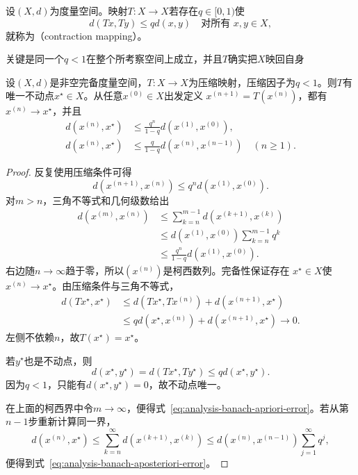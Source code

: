 \begin{definition}[压缩映射]
\label{def:analysis-contraction}
设$(X,d)$为度量空间。映射$T:X\to X$若存在$q\in[0,1)$使
\begin{equation}
  d(Tx,Ty)\leq qd(x,y)
  \quad\text{对所有 }x,y\in X,
\label{eq:analysis-contraction-definition}
\end{equation}
就称为（contraction mapping）。
\end{definition}
关键是同一个$q<1$在整个所考察空间上成立，并且$T$确实把$X$映回自身
\begin{theorem}[Banach压缩映射定理]
\label{thm:analysis-banach-fixed-point}
设$(X,d)$是非空完备度量空间，$T:X\to X$为压缩映射，压缩因子为$q<1$。则$T$有
唯一不动点$x^\star\in X$。从任意$x^{(0)}\in X$出发定义
$x^{(n+1)}=T(x^{(n)})$，都有$x^{(n)}\to x^\star$，并且
\begin{align}
  d(x^{(n)},x^\star)
  &\leq
  \frac{q^n}{1-q}d(x^{(1)},x^{(0)}),
\label{eq:analysis-banach-apriori-error}\\
  d(x^{(n)},x^\star)
  &\leq
  \frac{q}{1-q}d(x^{(n)},x^{(n-1)})
  \quad(n\geq1).
\label{eq:analysis-banach-aposteriori-error}
\end{align}
\end{theorem}
\begin{proof}
反复使用压缩条件可得
\[   d(x^{(n+1)},x^{(n)})   \leq   q^n d(x^{(1)},x^{(0)}). \]
对$m>n$，三角不等式和几何级数给出
\begin{align*}
  d(x^{(m)},x^{(n)})
  &\leq
  \sum_{k=n}^{m-1}d(x^{(k+1)},x^{(k)})\\
  &\leq
  d(x^{(1)},x^{(0)})\sum_{k=n}^{m-1}q^k\\
  &\leq
  \frac{q^n}{1-q}d(x^{(1)},x^{(0)}).
\end{align*}
右边随$n\to\infty$趋于零，所以$(x^{(n)})$是柯西数列。完备性保证存在
$x^\star\in X$使$x^{(n)}\to x^\star$。由压缩条件与三角不等式，
\begin{align*}
 d(Tx^\star,x^\star)
 &\leq d(Tx^\star,Tx^{(n)})+d(x^{(n+1)},x^\star)\\
 &\leq qd(x^\star,x^{(n)})+d(x^{(n+1)},x^\star)
 \longrightarrow0.
\end{align*}
左侧不依赖$n$，故$T(x^\star)=x^\star$。

若$y^\star$也是不动点，则
\[   d(x^\star,y^\star)   =   d(Tx^\star,Ty^\star)   \leq qd(x^\star,y^\star). \]
因为$q<1$，只能有$d(x^\star,y^\star)=0$，故不动点唯一。

在上面的柯西界中令$m\to\infty$，便得式~\eqref{eq:analysis-banach-apriori-error}。若从第$n-1$步重新计算同一界，
\[   d(x^{(n)},x^\star)   \leq   \sum_{k=n}^{\infty}d(x^{(k+1)},x^{(k)})   \leq   d(x^{(n)},x^{(n-1)})\sum_{j=1}^{\infty}q^j, \]
便得到式~\eqref{eq:analysis-banach-aposteriori-error}。
\end{proof}

